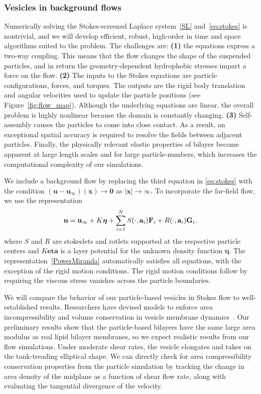 \subsubsection{Vesicles in background flows}
Numerically solving the Stokes-screened Laplace system~\eqref{SL}
and~\eqref{eq:stokes} is nontrivial, and we will develop efficient,
robust, high-order in time and space algorithms suited to the problem.
The challenges are: {\bf (1)} the equations express a two-way coupling.
This means that the flow changes the shape of the suspended particles,
and in return the geometry-dependent hydrophobic stresses impart a force
on the flow. {\bf (2)} The inputs to the Stokes equations are particle
configurations, forces, and torques. The outputs are the rigid body
translation and angular velocities used to update the particle positions
(see Figure~\ref{fig:flow_map}). Although the underlying equations are
linear, the overall problem is highly nonlinear because the domain is
constantly changing. {\bf (3)} Self-assembly causes the particles to
come into close contact. As a result, an exceptional spatial accuracy is
required to resolve the fields between adjacent particles. Finally, the
physically relevant elastic properties of bilayer become apparent at
large length scales and for large particle-numbers, which increases the
computational complexity of our simulations. 

We include a background flow by replacing the third equation in
\eqref{eq:stokes} with the condition $(\mathbf{u} -
\mathbf{u}_{\infty})(\mathbf{x}) \to \mathbf{0}$ as $|\mathbf{x}| \to
\infty$. To incorporate the far-field flow, we use the representation 
\begin{align}
\label{PowerMiranda}
  {\bf u} = {\bf u}_{\infty} + K\boldsymbol{\eta} + 
    \sum_{i=1}^N S(\cdot, {\bf a}_i) {\bf F}_i + 
                 R(\cdot, {\bf a}_i) {\bf G}_i.
\end{align}
where $S$ and $R$ are stokeslets and rotlets supported at the respective
particle centers and $K\boldsymbol{eta}$ is a layer potential for the
unknown density function $\boldsymbol{\eta}.$ The
representation~\eqref{PowerMiranda} automatically satisfies all
equations, with the exception of the rigid motion conditions. The rigid
motion conditions follow by requiring the viscous stress vanishes across
the particle boundaries.

We will compare the behavior of our particle-based vesicles in Stokes
flow to well-established results. 
Researchers have devised models to enforce area incompressibility and
volume conservation in vesicle membrane
dynamics~\cite{torres-sanchez_millan_arroyo_2019,
mahapatra_saintillan_rangamani_2020, Steigmann99, C6SM02452A}. Our
preliminary results show that the particle-based bilayers have the same
large area modulus as real lipid bilayer membranes, so we expect
realistic results from our flow simulations. Under moderate shear rates,
the vesicle elongates and takes on the tank-treading  elliptical shape.
We can directly check for area compressibility conservation properties
from the particle simulation by tracking the change in area density of
the midplane as a function of shear flow rate, along with evaluating the
tangential divergence of the velocity.


